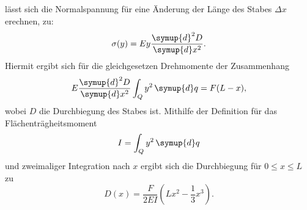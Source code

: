         lässt sich die Normalspannung für eine Änderung der Länge des Stabes $\Delta x$ erechnen, zu:
        \begin{equation}
        \label{eqn:Normalspannung}
            \sigma(y) = E y \frac{\symup{d}^2 D}{\symup{d}x^2}.
        \end{equation}
        Hiermit ergibt sich für die gleichgesetzen Drehmomente der Zusammenhang
        \begin{equation}
        \label{eqn:gleichsetzung}
            E \frac{\symup{d}^2 D}{\symup{d}x^2} \int_Q y^2 \, \symup{d}q = F(L - x),
        \end{equation}
        wobei $D$ die Durchbiegung des Stabes ist.
        Mithilfe der Definition für das Flächenträgheitsmoment
        \begin{equation}
        \label{eqn:flaechentraegheitsmoment}
            I = \int_Q y^2 \, \symup{d}q
        \end{equation}
        und zweimaliger Integration nach $x$ ergibt sich die Durchbiegung für $0 \leq x \leq L$ zu
        \begin{equation}
        \label{eqn:durchbiegung1}
            D(x) = \frac{F}{2 E I} (L x^2 - \frac{1}{3} x^3).
        \end{equation}

